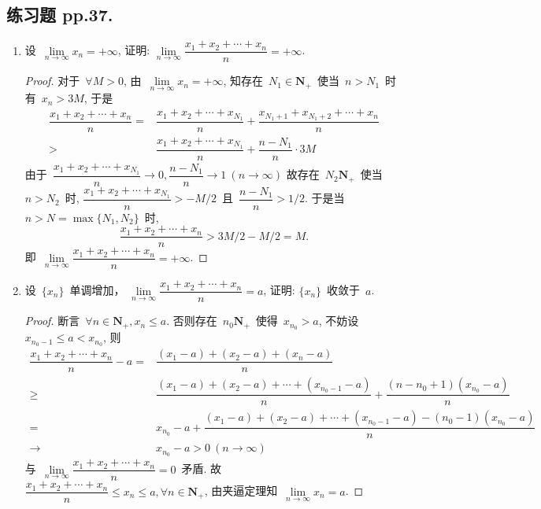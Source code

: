 \documentclass[UTF8,a4paper,11pt,twoside]{book}
\begin{document}
\subsection{练习题 pp.37.}
\begin{enumerate}
	\item 设~$\lim\limits_{n\to\infty} x_n=+\infty$, 证明: $\lim\limits_{n\to\infty} \dfrac{x_1+x_2+\cdots+x_n}{n}=+\infty$.
	      \begin{proof}
		      对于~$\forall M>0$, 由~$\lim\limits_{n\to\infty} x_n=+\infty$, 知存在~$N_1\in\mathbf{N}_{+}$~使当~$n>N_1$~时有~$x_n>3M$, 于是
		      \begin{equation*}
			      \begin{split}
				      \dfrac{x_1+x_2+\cdots+x_n}{n}=&\dfrac{x_1+x_2+\cdots+x_{N_1}}{n}+\dfrac{x_{N_1+1}+x_{N_1+2}+\cdots+x_n}{n}\\
				      >&\dfrac{x_1+x_2+\cdots+x_{N_1}}{n}+\dfrac{n-N_1}{n}\cdot 3M
			      \end{split}
		      \end{equation*}
		      由于~$\dfrac{x_1+x_2+\cdots+x_{N_1}}{n}\to 0, \dfrac{n-N_1}{n}\to 1\ (n\to\infty)$ 故存在~$N_2\mathbf{N}_{+}$~使当~$n>N_2$~时, $\dfrac{x_1+x_2+\cdots+x_{N_1}}{n}>-M/2$~且~$\dfrac{n-N_1}{n}>1/2$. 于是当~$n>N=\max\{N_1,N_2\}$~时,
		      \[
			      \dfrac{x_1+x_2+\cdots+x_n}{n}>3M/2-M/2=M.
		      \]
		      即~$\lim\limits_{n\to\infty} \dfrac{x_1+x_2+\cdots+x_n}{n}=+\infty$.\qedhere
	      \end{proof}
	\item 设~$\{x_n\}$~单调增加， $\lim\limits_{n\to\infty} \dfrac{x_1+x_2+\cdots+x_n}{n}=a$, 证明: $\{x_n\}$~收敛于~$a$.
	      \begin{proof}
		      断言~$\forall n\in\mathbf{N}_{+}, x_n\leqslant a$. 否则存在~$n_0\mathbf{N}_{+}$~使得~$x_{n_0}>a$, 不妨设~$x_{n_0-1}\leqslant a<x_{n_0}$, 则
		      \begin{equation*}
			      \begin{split}
				      \dfrac{x_1+x_2+\cdots+x_n}{n}-a=&\dfrac{(x_1-a)+(x_2-a)+(x_n-a)}{n}\\
				      \geqslant& \dfrac{(x_1-a)+(x_2-a)+\cdots+(x_{n_0-1}-a)}{n}+\dfrac{(n-n_0+1)(x_{n_0}-a)}{n}\\
				      =& x_{n_0}-a+\dfrac{(x_1-a)+(x_2-a)+\cdots+(x_{n_0-1}-a)-(n_0-1)(x_{n_0}-a)}{n}\\
				      \to& x_{n_0}-a>0\ (n\to\infty)
			      \end{split}
		      \end{equation*}
		      与~$\lim\limits_{n\to\infty} \dfrac{x_1+x_2+\cdots+x_n}{n}=0$~矛盾. 故~$\dfrac{x_1+x_2+\cdots+x_n}{n}\leqslant x_n\leqslant a, \forall n\in\mathbf{N}_{+}$, 由夹逼定理知~$\lim\limits_{n\to\infty} x_n=a$.\qedhere

\end{proof}
\end{enumerate}
\end{document}
